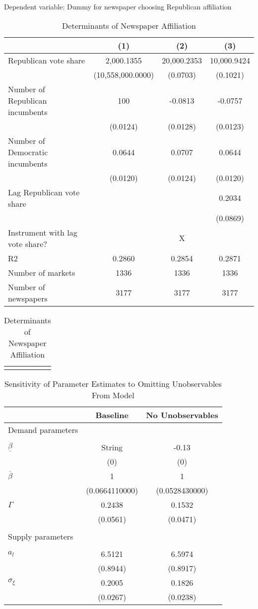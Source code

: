 \documentclass[english]{article}
\providecommand{\tabularnewline}{\\}
\begin{document}
\begin{table}[H]
\caption{Determinants of Newspaper Affiliation\label{tab:panel_supply}}
\smallskip{}

Dependent variable: Dummy for newspaper choosing Republican affiliation
\begin{raggedright}
\begin{tabular}{lccc}
\hline 
 & (1) & (2) & (3)\tabularnewline
\hline 
Republican vote share & 2,000.1355 & 20,000.2353 & 10,000.9424\tabularnewline
 & (10,558,000.0000) & (0.0703) & (0.1021)\tabularnewline
Number of Republican incumbents & 100 & -0.0813 & -0.0757\tabularnewline
 & (0.0124) & (0.0128) & (0.0123)\tabularnewline
Number of Democratic incumbents & 0.0644 & 0.0707 & 0.0644\tabularnewline
 & (0.0120) & (0.0124) & (0.0120)\tabularnewline
Lag Republican vote share &  &  & 0.2034\tabularnewline
 &  &  & (0.0869)\tabularnewline
Instrument with lag vote share? &  & X & \tabularnewline
\hline 
R2 & 0.2860 & 0.2854 & 0.2871\tabularnewline
Number of markets & 1336 & 1336 & 1336\tabularnewline
Number of newspapers & 3177 & 3177 & 3177\tabularnewline
\hline 
\end{tabular}
\par\end{raggedright}
\raggedright{}{\footnotesize{}}%
\begin{tabular}{>{\raggedright}p{6in}}
\noalign{\vskip\doublerulesep}
\raggedright{}\tabularnewline
\end{tabular}{\footnotesize \par}
\end{table}

\begin{table}[H]
\caption{Sensitivity of Parameter Estimates to Omitting Unobservables From
Model\label{tab:unobservables}}
\smallskip{}

\centering{}%
\begin{tabular}{lcc}
\hline 
 & Baseline & No Unobservables\tabularnewline
\hline 
\noalign{\vskip\doublerulesep}
Demand parameters &  & \tabularnewline
 &  & \tabularnewline
\qquad{}$\underline{\beta}$ & String & -0.13\tabularnewline
 & (0) & (0)\tabularnewline[\doublerulesep]
\qquad{}$\overline{\beta}$ & 1 & 1\tabularnewline
 & (0.0664110000) & (0.0528430000)\tabularnewline[\doublerulesep]
\qquad{}$\Gamma$ & 0.2438 & 0.1532\tabularnewline
 & (0.0561) & (0.0471)\tabularnewline[\doublerulesep]
 &  & \tabularnewline
Supply parameters &  & \tabularnewline
 &  & \tabularnewline
\qquad{}$a_{l}$ & 6.5121 & 6.5974\tabularnewline
 & (0.8944) & (0.8917)\tabularnewline[\doublerulesep]
\qquad{}$\sigma_{\xi}$ & 0.2005 & 0.1826\tabularnewline
 & (0.0267) & (0.0238)\tabularnewline[\doublerulesep]
\hline 
\end{tabular}
\end{table}
\end{document}
